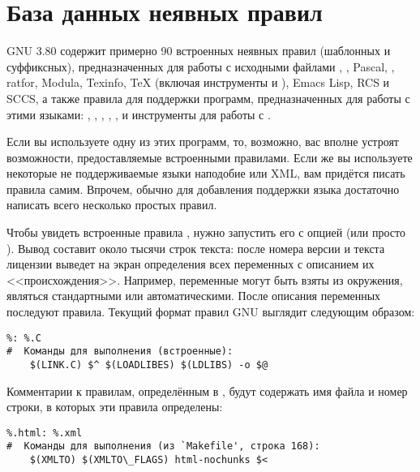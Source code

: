 \section{База данных неявных правил}
\label{sec:implicit_rule_db}

GNU \GNUmake{} 3.80 содержит примерно 90 встроенных неявных правил
(шаблонных и суффиксных), предназначенных для работы с исходными
файлами \Clang{}, \Cplusplus{}, Pascal, \FORTRAN{}, ratfor, Modula,
Texinfo, \TeX{} (включая инструменты  и
), Emacs Lisp, RCS и SCCS, а также правила для
поддержки программ, предназначенных для работы с этими языками:
, , ,  ,
,  и инструменты для работы с
.

Если вы используете одну из этих программ, то, возможно, вас вполне
устроят возможности, предоставляемые встроенными правилами. Если же вы
используете некоторые не поддерживаемые языки наподобие \Java{} или
XML, вам придётся писать правила самим. Впрочем, обычно для добавления
поддержки языка достаточно написать всего несколько простых правил.

Чтобы увидеть встроенные правила \GNUmake{}, нужно запустить его с
опцией  (или просто
). Вывод составит около тысячи строк текста: после номера
версии и текста лицензии \GNUmake{} выведет на экран определения всех
переменных с описанием их <<происхождения>>. Например, переменные
могут быть взяты из окружения, являться стандартными или
автоматическими. После описания переменных последуют правила. Текущий
формат правил GNU \GNUmake{} выглядит следующим образом:

{\footnotesize
\begin{verbatim}
%: %.C
#  Команды для выполнения (встроенные):
    $(LINK.C) $^ $(LOADLIBES) $(LDLIBS) -o $@
\end{verbatim}
}

Комментарии к правилам, определённым в \Makefile{}, будут содержать
имя файла и номер строки, в которых эти правила определены:

{\footnotesize
\begin{verbatim}
%.html: %.xml
#  Команды для выполнения (из `Makefile', строка 168):
    $(XMLTO) $(XMLTO\_FLAGS) html-nochunks $<
\end{verbatim}
}

